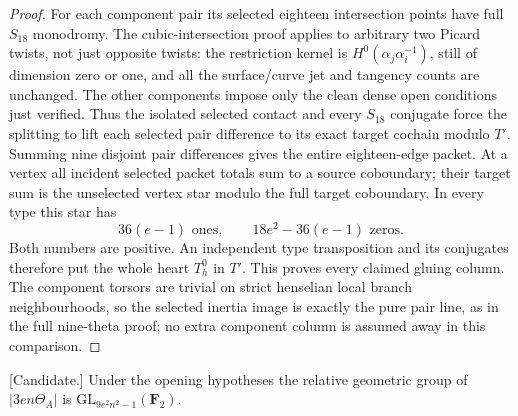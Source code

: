 \begin{proof}
For each component pair its selected eighteen intersection points
have full $S_{18}$ monodromy. The cubic-intersection proof applies
to arbitrary two Picard twists, not just opposite twists: the
restriction kernel is $H^0(\alpha_j\alpha_i^{-1})$, still of
dimension zero or one, and all the surface/curve jet and tangency
counts are unchanged. The other components impose only the clean
dense open conditions just verified. Thus the isolated selected
contact and every $S_{18}$ conjugate force the splitting to lift
each selected pair difference to its exact target cochain modulo
$T'$. Summing nine disjoint pair differences gives the entire
eighteen-edge packet. At a vertex all incident selected packet
totals sum to a source coboundary; their target sum is the
unselected vertex star modulo the full target coboundary. In
every type this star has
\[
              36(e-1)\text{ ones},\qquad
              18e^2-36(e-1)\text{ zeros}.                         \tag{EC.2}
\]
Both numbers are positive. An independent type transposition
and its conjugates therefore put the whole heart $T_h^0$ in $T'$.
This proves every claimed gluing column. The component torsors
are trivial on strict henselian local branch neighbourhoods, so
the selected inertia image is exactly the pure pair line, as in
the full nine-theta proof; no extra component column is assumed
away in this comparison.
\end{proof}

\begin{theorem}
\label{thm:cubic-component-arbitrary-odd-norm-transfer-candidate}
\textup{[Candidate.]}
Under the opening hypotheses the relative geometric group of
$|3en\Theta_A|$ is $\mathrm{GL}_{9e^2n^2-1}(\mathbf F_2)$.
\end{theorem}

